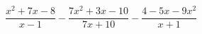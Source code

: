 \begin{ex}[type=expression]
	\begin{condition}
		\( \dfrac{x^2+7x-8}{x-1}-\dfrac{7x^2+3x-10}{7x+10}-\dfrac{4-5x-9x^2}{x+1} \)
	\end{condition}
\end{ex}